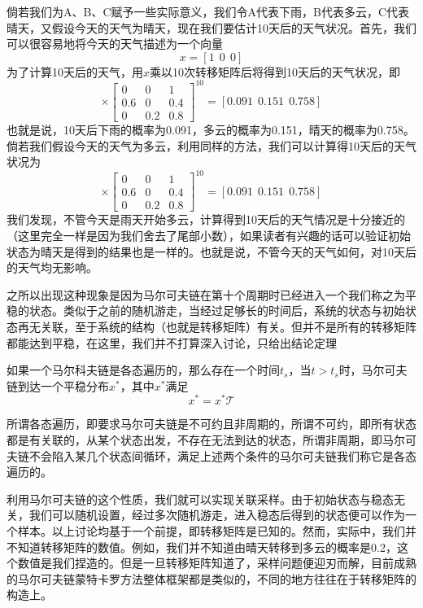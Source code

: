 倘若我们为A、B、C赋予一些实际意义，我们令A代表下雨，B代表多云，C代表晴天，又假设今天的天气为晴天，现在我们要估计10天后的天气状况。首先，我们可以很容易地将今天的天气描述为一个向量
\begin{equation}
x = [1~~0~~0]
\end{equation}
为了计算10天后的天气，用$x$乘以10次转移矩阵后将得到10天后的天气状况，即
\begin{equation}
[1~~0~~0] \times
\left[
\begin{array}{ccc}
0 & 0 & 1\\
0.6 &0 & 0.4\\
0 & 0.2 & 0.8
\end{array}
\right]^{10}
=[0.091~~0.151~~0.758]
\end{equation}
也就是说，10天后下雨的概率为0.091，多云的概率为0.151，晴天的概率为0.758。倘若我们假设今天的天气为多云，利用同样的方法，我们可以计算得10天后的天气状况为
\begin{equation}
[0~~1~~0] \times
\left[
\begin{array}{ccc}
0 & 0 & 1\\
0.6 &0 & 0.4\\
0 & 0.2 & 0.8
\end{array}
\right]^{10}
=[0.091~~0.151~~0.758]
\end{equation}
我们发现，不管今天是雨天开始多云，计算得到10天后的天气情况是十分接近的（这里完全一样是因为我们舍去了尾部小数），如果读者有兴趣的话可以验证初始状态为晴天是得到的结果也是一样的。也就是说，不管今天的天气如何，对10天后的天气均无影响。

之所以出现这种现象是因为马尔可夫链在第十个周期时已经进入一个我们称之为平稳的状态。类似于之前的随机游走，当经过足够长的时间后，系统的状态与初始状态再无关联，至于系统的结构（也就是转移矩阵）有关。但并不是所有的转移矩阵都能达到平稳，在这里，我们并不打算深入讨论，只给出结论定理
\begin{theorem}\label{theo:MC}
如果一个马尔科夫链是各态遍历的，那么存在一个时间$t_s$，当$t>t_s$时，马尔可夫链到达一个平稳分布$x^*$，其中$x^*$满足
\begin{equation}
x^* = x^* \mathcal{T}
\end{equation}
\end{theorem}
所谓各态遍历，即要求马尔可夫链是不可约且非周期的，所谓不可约，即所有状态都是有关联的，从某个状态出发，不存在无法到达的状态，所谓非周期，即马尔可夫链不会陷入某几个状态间循环，满足上述两个条件的马尔可夫链我们称它是各态遍历的。

利用马尔可夫链的这个性质，我们就可以实现关联采样。由于初始状态与稳态无关，我们可以随机设置，经过多次随机游走，进入稳态后得到的状态便可以作为一个样本。以上讨论均基于一个前提，即转移矩阵是已知的。然而，实际中，我们并不知道转移矩阵的数值。例如，我们并不知道由晴天转移到多云的概率是0.2，这个数值是我们捏造的。但是一旦转移矩阵知道了，采样问题便迎刃而解，目前成熟的马尔可夫链蒙特卡罗方法整体框架都是类似的，不同的地方往往在于转移矩阵的构造上。

